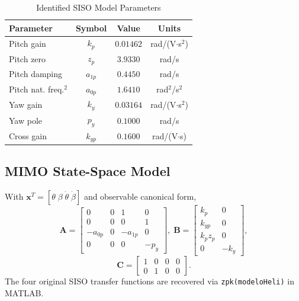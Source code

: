 \documentclass[conference]{IEEEtran}
\begin{document}
\begin{table}[H]
    \centering
    \caption{Identified SISO Model Parameters}
    \label{tab:siso_params}
    \footnotesize
    \begin{tabular}{lccc}
        \toprule
        \textbf{Parameter} & \textbf{Symbol} & \textbf{Value} & \textbf{Units} \\
        \midrule
        Pitch gain          & $k_p$    & $0.01462$ & rad/(V$\cdot$s$^2$) \\
        Pitch zero          & $z_p$    & $3.9330$  & rad/s \\
        Pitch damping       & $a_{1p}$ & $0.4450$  & rad/s \\
        Pitch nat. freq.$^2$& $a_{0p}$ & $1.6410$  & rad$^2$/s$^2$ \\
        Yaw gain            & $k_y$    & $0.03164$ & rad/(V$\cdot$s$^2$) \\
        Yaw pole            & $p_y$    & $0.1000$  & rad/s \\
        Cross gain          & $k_{yp}$ & $0.1600$  & rad/(V$\cdot$s) \\
        \bottomrule
    \end{tabular}
\end{table}

\subsection{MIMO State-Space Model}

With $\mathbf{x}^T = [\theta\; \beta\; \dot{\theta}\; \dot{\beta}]$ and observable canonical form,
\begin{equation}
\mathbf{A} = \begin{bmatrix} 0 & 0 & 1 & 0 \\ 0 & 0 & 0 & 1 \\ -a_{0p} & 0 & -a_{1p} & 0 \\ 0 & 0 & 0 & -p_y \end{bmatrix}, \;
\mathbf{B} = \begin{bmatrix} k_p & 0 \\ k_{yp} & 0 \\ k_p z_p & 0 \\ 0 & -k_y \end{bmatrix},
\end{equation}
\begin{equation}
\mathbf{C} = \begin{bmatrix} 1 & 0 & 0 & 0 \\ 0 & 1 & 0 & 0 \end{bmatrix}.
\end{equation}
The four original SISO transfer functions are recovered via \texttt{zpk(modeloHeli)} in MATLAB.
\end{document}

